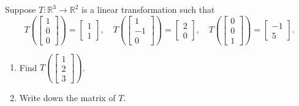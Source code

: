 \begin{problem}
\label{2009_a7_4}
Suppose $T:\mathbb{R}^3\to \mathbb{R}^2$ is a linear transformation
such that
$$
T\left(\left[\begin{array}{c}1\\ 0\\ 0 \end{array}\right]\right)=\left[\begin{array}{c}1\\ 1\end{array}\right],\quad
T\left(\left[\begin{array}{c}1\\ -1\\ 0 \end{array}\right]\right)=\left[\begin{array}{c}2\\ 0\end{array}\right],\quad
T\left(\left[\begin{array}{c}0\\0 \\ 1 \end{array}\right]\right)=\left[\begin{array}{c}-1\\ 5\end{array}\right].
$$
    \begin{enumerate}
        \item Find  $T\left(\left[\begin{array}{c}1\\ 2\\ 3 \end{array}\right]\right)$.
        \item Write down the matrix of $T$.
    \end{enumerate}
\end{problem}

